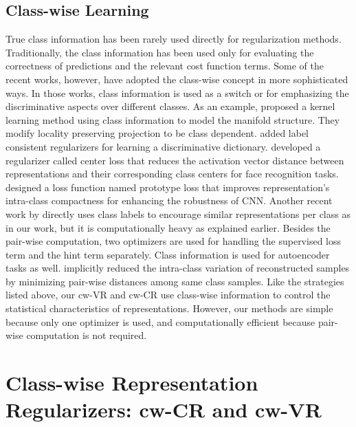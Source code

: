 \documentclass[letterpaper]{article} %
\begin{document}
\subsection{Class-wise Learning}
True class information has been rarely used directly for regularization methods.
Traditionally, the class information has been used only for evaluating the correctness of
predictions and the relevant cost function terms. Some of the recent works, however, 
have adopted the class-wise concept in more sophisticated ways. In those works, 
class information is used as a switch or for emphasizing the discriminative aspects over different classes. 
%
As an example, \cite{li2008kernel} proposed a kernel learning method using class information to model the manifold structure. They modify locality preserving projection to be class dependent. \cite{jiang2011learning} 
added label consistent regularizers for learning a discriminative dictionary. 
%
\cite{wen2016discriminative} developed a regularizer called center loss that reduces the activation vector distance between representations and their corresponding class centers for face recognition tasks.
%
\cite{yang2018robust} designed a loss function named prototype loss that improves representation's intra-class compactness for enhancing the robustness of CNN.
%
Another recent work by \cite{belharbi2017neural} directly uses class labels to encourage similar representations per class as in our work, but it is computationally heavy as explained earlier.  
Besides the pair-wise computation, two optimizers are used for handling the supervised loss term and the hint term separately. 
%
Class information is used for autoencoder tasks as well. \cite{shi2016learning} implicitly reduced the intra-class variation of reconstructed samples by minimizing pair-wise distances among same class samples.
%
Like the strategies listed above, our cw-VR and cw-CR use class-wise information to control the statistical characteristics of representations. However, our methods are simple because only one optimizer is used, and computationally efficient because pair-wise computation is not required.



\section{Class-wise Representation Regularizers: cw-CR and cw-VR}
\end{document}
